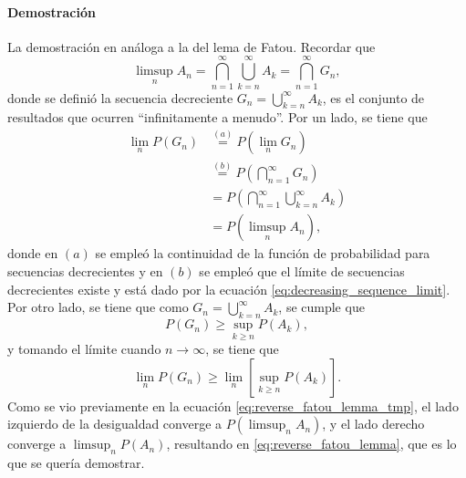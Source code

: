 \documentclass[a4paper]{report}
\begin{document}
\paragraph{Demostración} La demostración en análoga a la del lema de Fatou. Recordar que 
\[
 \limsup_n A_n = \bigcap_{n=1}^{\infty }\bigcup_{k=n}^{\infty }A_k = \bigcap_{n=1}^{\infty}G_n,
\]
donde se definió la secuencia decreciente \(G_n=\bigcup_{k=n}^{\infty }A_k\), es el conjunto de resultados que ocurren ``infinitamente a menudo''. Por un lado, se tiene que
\begin{align}\label{eq:reverse_fatou_lemma_tmp}
 \lim_n P\left(G_n\right)&\overset{(a)}{=}P\left(\lim_n G_n\right)\nonumber\\
   &\overset{(b)}{=}P\left(\bigcap_{n=1}^{\infty } G_n\right)\nonumber\\
   &=P\left(\bigcap_{n=1}^{\infty } \bigcup_{k=n}^{\infty }A_k\right)\nonumber\\
   &=P\left(\limsup_n A_n\right),
\end{align}
donde en \((a)\) se empleó la continuidad de la función de probabilidad para secuencias decrecientes y en \((b)\) se empleó que el límite de secuencias decrecientes existe y está dado por la ecuación \ref{eq:decreasing_sequence_limit}. Por otro lado, se tiene que como \(G_n=\bigcup_{k=n}^{\infty }A_k\), se cumple que
\[
 P(G_n)\geq \sup_{k\geq n} P(A_k),
\]
y tomando el límite cuando \(n\to\infty\), se tiene que
\[
 \lim_n P(G_n)\geq \lim_n\left[\sup_{k\geq n} P(A_k)\right].
\]
Como se vio previamente en la ecuación \ref{eq:reverse_fatou_lemma_tmp}, el lado izquierdo de la desigualdad converge a \(P\left(\limsup_n A_n\right)\), y el lado derecho converge a \(\limsup_n P(A_n)\), resultando en \ref{eq:reverse_fatou_lemma}, que es lo que se quería demostrar.
\end{document}
